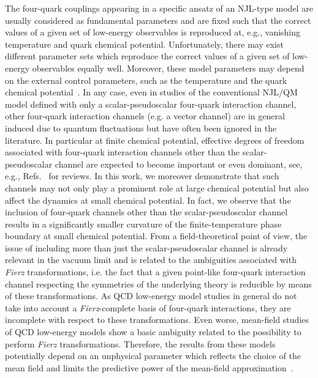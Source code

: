 \documentclass[prd,english,preprintnumbers,amsmath,amssymb,nofootinbib,twocolumn,superscriptaddress]{revtex4-1}
\begin{document}
{The four-quark couplings appearing in a specific ansatz of an NJL-type model are usually considered as fundamental parameters 
and are
fixed such that the correct values of a given set of low-energy observables is reproduced at, e.g., vanishing temperature and quark chemical potential.
Unfortunately, there may exist different parameter sets which reproduce the correct values of a given set of
low-energy observables equally well. Moreover, these model parameters may depend on the external control parameters, such
as the temperature and the quark chemical potential~\cite{Springer:2016cji}.
In any case, even in studies of the conventional NJL/QM model {defined
with only a scalar-pseudoscalar four-quark} interaction channel, other four-quark interaction channels (e.g. a vector channel)
are in general induced due to quantum fluctuations 
but {have often been} ignored in the literature. {In particular at finite chemical potential, 
effective degrees of freedom 
associated with four-quark interaction channels other than the scalar-pseudoscalar channel are expected to become
important or even dominant, see, e.g., Refs.~\cite{Bailin:1983bm,Buballa:2003qv,Alford:2007xm,Anglani:2013gfu} for reviews.
In this work, we moreover demonstrate that such channels may not only play a 
prominent role at large chemical potential but also affect the dynamics at small chemical
potential. In fact, we observe that the inclusion of four-quark channels 
other than the scalar-pseudoscalar channel results in a significantly smaller
curvature of the finite-temperature phase boundary at small chemical potential.
From a field-theoretical point of view, the issue of including more than just
the scalar-pseudoscalar channel is already relevant in the vacuum limit and
is related to the ambiguities associated with {\it Fierz} transformations, i.e. the} fact that 
a given point-like four-quark interaction channel respecting the symmetries of the underlying theory is reducible by means of these transformations. 
As QCD low-energy model studies in general do not take into account a {\it Fierz}-complete basis of four-quark interactions, they are incomplete with
respect to these transformations.
Even worse, mean-field studies of QCD low-energy models show a basic ambiguity related to the possibility to perform {\it Fierz} 
transformations. {Therefore, the} results from these models 
potentially depend on an unphysical parameter which reflects the choice of the mean field and
limits the predictive power of the mean-field approximation~\cite{Jaeckel:2002rm}.

}
\end{document}

